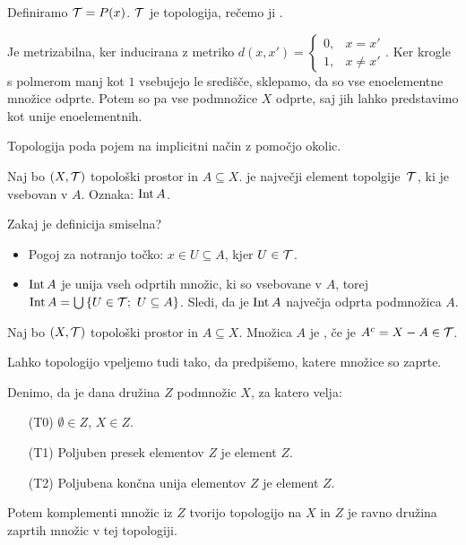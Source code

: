 \begin{primer}
    Definiramo $\mathcal{T} = P(x)$. $\mathcal{T}$ je topologija, rečemo ji .

    Je metrizabilna, ker inducirana z metriko $d(x, x') = 
    \begin{cases}
        0, &x = x' \\
        1, &x \neq x'    
    \end{cases}.$ Ker krogle s polmerom manj kot $1$ vsebujejo le središče, sklepamo, da so vse enoelementne množice odprte. Potem so pa vse podmnožice $X$ odprte, saj jih lahko predstavimo kot unije enoelementnih.
\end{primer}

\begin{opomba}
    Topologija poda pojem  na implicitni način z pomočjo okolic. 
\end{opomba}

\begin{definicija}
    Naj bo $(X, \mathcal{T})$ topološki prostor in $A \subseteq X$.  je največji element topolgije~$\mathcal{T}$, ki je vsebovan v $A$. Oznaka: $\operatorname{Int} A$.
\end{definicija}

\begin{opomba}
    Zakaj je definicija smiselna?
    \begin{itemize}        
        \item Pogoj za notranjo točko: $x \in U \subseteq A$, kjer $U \in \mathcal{T}$.
        \item $\operatorname{Int} A$ je unija vseh odprtih množic, ki so vsebovane v $A$, torej $\operatorname{Int} A = \bigcup \left\{U \in \mathcal{T}; \ U \subseteq A\right\}$. Sledi, da je $\operatorname{Int} A$ največja odprta podmnožica $A$.
    \end{itemize}
\end{opomba}

\begin{definicija}
    Naj bo $(X, \mathcal{T})$ topološki prostor in $A \subseteq X$. Množica $A$ je , če je $A^c = X - A \in \mathcal{T}$.
\end{definicija}

\begin{opomba}
    Lahko topologijo vpeljemo tudi tako, da predpišemo, katere množice so zaprte.

    Denimo, da je dana družina $Z$ podmnožic $X$, za katero velja:
    \begin{enumerate}
        \item[(T0)] $\emptyset \in Z$, $X \in Z$.
        \item[(T1)] Poljuben presek elementov $Z$ je element $Z$.
        \item[(T2)] Poljubena končna unija elementov $Z$ je element $Z$.
    \end{enumerate}
    Potem komplementi množic iz $Z$ tvorijo topologijo na $X$ in $Z$ je ravno družina zaprtih množic v tej topologiji.
\end{opomba}

